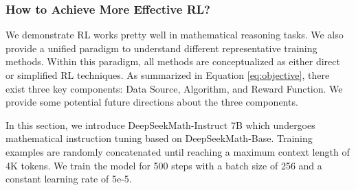 \subsubsection{How to Achieve More Effective RL?}
\label{sec:effec_rl}
We demonstrate RL works pretty well in mathematical reasoning tasks. We also provide a unified paradigm to understand different representative training methods. Within this paradigm, all methods are conceptualized as either direct or simplified  RL techniques. As summarized in Equation \ref{eq:objective}, there exist three key components: Data Source, Algorithm, and Reward Function. We provide some potential future directions about the three components.

In this section, we introduce DeepSeekMath-Instruct 7B which undergoes mathematical instruction tuning based on DeepSeekMath-Base. Training examples are randomly concatenated until reaching a maximum context length of 4K tokens. We train the model for 500 steps with a batch size of 256 and a constant learning rate of 5e-5.

